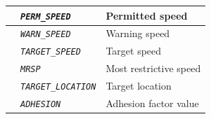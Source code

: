 \documentclass{template/openetcs}
\begin{document}
\begin{itemize}
\begin{longtable}{|l|l|l|}
			\hline
			
			&	\begin{minipage}[t]{0.40\linewidth} \emph{\texttt{PERM\_SPEED}} \end{minipage}
			&	\begin{minipage}[t]{0.38\linewidth}Permitted speed \end{minipage} \\
			
			\hline
			
			&	\begin{minipage}[t]{0.40\linewidth} \emph{\texttt{WARN\_SPEED}} \end{minipage}
			&	\begin{minipage}[t]{0.38\linewidth} Warning speed \end{minipage} \\
			
			\hline
			
			&	\begin{minipage}[t]{0.40\linewidth} \emph{\texttt{TARGET\_SPEED}} \end{minipage}
			&	\begin{minipage}[t]{0.38\linewidth} Target speed \end{minipage} \\
			
			\hline
			
			&	\begin{minipage}[t]{0.40\linewidth} \emph{\texttt{MRSP}} \end{minipage}
			&	\begin{minipage}[t]{0.38\linewidth} Most restrictive speed \end{minipage} \\
			
			\hline
			
			&	\begin{minipage}[t]{0.40\linewidth} \emph{\texttt{TARGET\_LOCATION}} \end{minipage}
			&	\begin{minipage}[t]{0.38\linewidth} Target location \end{minipage} \\
			
			\hline
			
			&	\begin{minipage}[t]{0.40\linewidth} \emph{\texttt{ADHESION}} \end{minipage}
			&	\begin{minipage}[t]{0.38\linewidth} Adhesion factor value \end{minipage} \\
			

\end{longtable}
\end{itemize}
\end{document}
